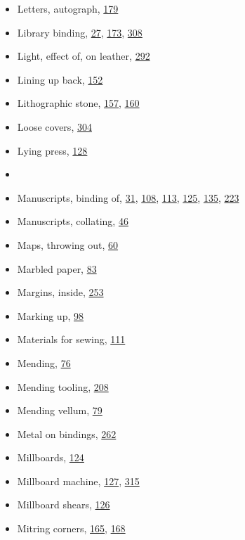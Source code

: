 \documentclass[
]{article}
\begin{document}
\begin{itemize}
\item
  Letters, autograph, \protect\hyperlink{Page_179}{179}
\item
  Library binding, \protect\hyperlink{Page_27}{27},
  \protect\hyperlink{Page_173}{173}, \protect\hyperlink{Page_308}{308}
\item
  Light, effect of, on leather, \protect\hyperlink{Page_292}{292}
\item
  Lining up back, \protect\hyperlink{Page_152}{152}
\item
  Lithographic stone, \protect\hyperlink{Page_157}{157},
  \protect\hyperlink{Page_160}{160}
\item
  Loose covers, \protect\hyperlink{Page_304}{304}
\item
  \protect\hypertarget{Lying_press}{}{}Lying press,
  \protect\hyperlink{Page_128}{128}
\item
  ~
\item
  {Manuscripts}, binding of, \protect\hyperlink{Page_31}{31},
  \protect\hyperlink{Page_108}{108}, \protect\hyperlink{Page_113}{113},
  \protect\hyperlink{Page_125}{125}, \protect\hyperlink{Page_135}{135},
  \protect\hyperlink{Page_223}{223}
\item
  Manuscripts, collating, \protect\hyperlink{Page_46}{46}
\item
  Maps, throwing out, \protect\hyperlink{Page_60}{60}
\item
  Marbled paper, \protect\hyperlink{Page_83}{83}
\item
  Margins, inside, \protect\hyperlink{Page_253}{253}
\item
  Marking up, \protect\hyperlink{Page_98}{98}
\item
  Materials for sewing, \protect\hyperlink{Page_111}{111}
\item
  Mending, \protect\hyperlink{Page_76}{76}
\item
  Mending tooling, \protect\hyperlink{Page_208}{208}
\item
  Mending vellum, \protect\hyperlink{Page_79}{79}
\item
  Metal on bindings, \protect\hyperlink{Page_262}{262}
\item
  Millboards, \protect\hyperlink{Page_124}{124}
\item
  Millboard machine, \protect\hyperlink{Page_127}{127},
  \protect\hyperlink{Page_315}{315}
\item
  Millboard shears, \protect\hyperlink{Page_126}{126}
\item
  Mitring corners, \protect\hyperlink{Page_165}{165},
  \protect\hyperlink{Page_168}{168}

\end{itemize}
\end{document}
